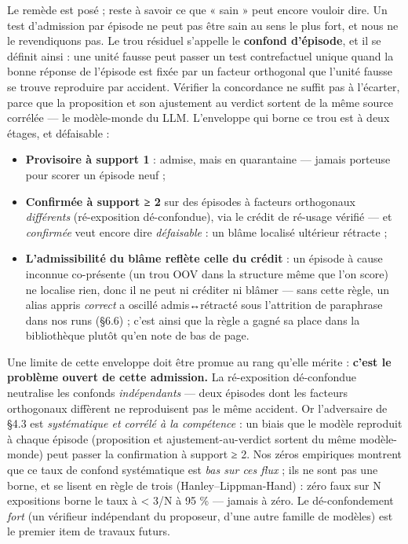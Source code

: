 \documentclass[11pt]{article}
\begin{document}
Le remède est posé ; reste à savoir ce que « sain » peut encore vouloir dire. Un test d'admission par épisode ne peut pas être sain au sens le plus fort, et nous ne le revendiquons pas. Le trou résiduel s'appelle le \textbf{confond d'épisode}, et il se définit ainsi : une unité fausse peut passer un test contrefactuel unique quand la bonne réponse de l'épisode est fixée par un facteur orthogonal que l'unité fausse se trouve reproduire par accident. Vérifier la concordance ne suffit pas à l'écarter, parce que la proposition et son ajustement au verdict sortent de la même source corrélée — le modèle-monde du LLM. L'enveloppe qui borne ce trou est à deux étages, et défaisable :

\begin{itemize}
\item \textbf{Provisoire à support 1} : admise, mais en quarantaine — jamais porteuse pour scorer un épisode neuf ;
\item \textbf{Confirmée à support ≥ 2} sur des épisodes à facteurs orthogonaux \emph{différents} (ré-exposition dé-confondue), via le crédit de ré-usage vérifié — et \emph{confirmée} veut encore dire \emph{défaisable} : un blâme localisé ultérieur rétracte ;
\item \textbf{L'admissibilité du blâme reflète celle du crédit} : un épisode à cause inconnue co-présente (un trou OOV dans la structure même que l'on score) ne localise rien, donc il ne peut ni créditer ni blâmer — sans cette règle, un alias appris \emph{correct} a oscillé admis↔rétracté sous l'attrition de paraphrase dans nos runs (§6.6) ; c'est ainsi que la règle a gagné sa place dans la bibliothèque plutôt qu'en note de bas de page.
\end{itemize}

Une limite de cette enveloppe doit être promue au rang qu'elle mérite : \textbf{c'est le problème ouvert de cette admission.} La ré-exposition dé-confondue neutralise les confonds \emph{indépendants} — deux épisodes dont les facteurs orthogonaux diffèrent ne reproduisent pas le même accident. Or l'adversaire de §4.3 est \emph{systématique et corrélé à la compétence} : un biais que le modèle reproduit à chaque épisode (proposition et ajustement-au-verdict sortent du même modèle-monde) peut passer la confirmation à support ≥ 2. Nos zéros empiriques montrent que ce taux de confond systématique est \emph{bas sur ces flux} ; ils ne sont pas une borne, et se lisent en règle de trois (Hanley–Lippman-Hand) : zéro faux sur N expositions borne le taux à < 3/N à 95 \% — jamais à zéro. Le dé-confondement \emph{fort} (un vérifieur indépendant du proposeur, d'une autre famille de modèles) est le premier item de travaux futurs.
\end{document}
